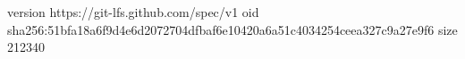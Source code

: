 version https://git-lfs.github.com/spec/v1
oid sha256:51bfa18a6f9d4e6d2072704dfbaf6e10420a6a51c4034254ceea327c9a27e9f6
size 212340
